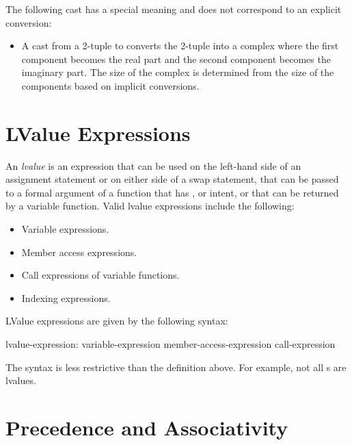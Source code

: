 The following cast has a special meaning and does not correspond to an
explicit conversion:
\begin{itemize}
\item
  A cast from a 2-tuple to  converts the 2-tuple into a
  complex where the first component becomes the real part and the
  second component becomes the imaginary part.  The size of the
  complex is determined from the size of the components based on
  implicit conversions.
\end{itemize}

\section{LValue Expressions}
\label{LValue_Expressions}

An {\em lvalue} is an expression that can be used on the left-hand
side of an assignment statement or on either side of a swap statement,
that can be passed to a formal argument of a function that
has ,  or  intent, or that can be returned by a
variable function.  Valid lvalue expressions include the following:
\begin{itemize}
\item
 Variable expressions.
\item
 Member access expressions.
\item
 Call expressions of variable functions.
\item
 Indexing expressions.
\end{itemize}

LValue expressions are given by the following syntax:
\begin{syntax}
lvalue-expression:
  variable-expression
  member-access-expression
  call-expression
\end{syntax}
The syntax is less restrictive than the definition above.  For
example, not all s are lvalues.

\section{Precedence and Associativity}
\label{Operator_Precedence_and_Associativity}

